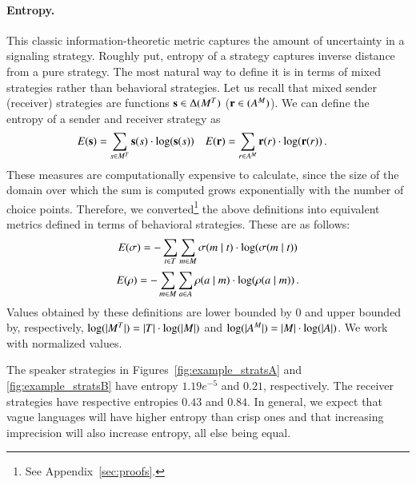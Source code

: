 \paragraph{Entropy.} This classic information-theoretic metric
captures the amount of uncertainty in a signaling strategy. Roughly
put, entropy of a strategy captures inverse distance from a pure
strategy. The most natural way to define it is in terms of mixed
strategies rather than behavioral strategies.  Let us recall that
mixed sender (receiver) strategies are functions $\mathrm{\mathbf{s}} \in
\Delta(M^T)$ ($\mathrm{\mathbf{r}} \in (A^M)$).  We can
define the entropy of a sender and receiver strategy as
\begin{align*}
  E(\mathrm{\mathbf{s}}) & = \sum_{s \in M^T} \mathrm{\mathbf{s}}(s) \cdot
  \log(\mathrm{\mathbf{s}}(s)) & 
  E(\mathrm{\mathbf{r}}) & = \sum_{r \in A^M} \mathrm{\mathbf{r}}(r) \cdot \log(\mathrm{\mathbf{r}}(r)) \,.
\end{align*} 
These measures are computationally expensive to calculate, since the
size of the domain over which the sum is computed grows exponentially
with the number of choice points.  Therefore, we
converted\footnote{See Appendix~\ref{sec:proofs}.} the above definitions into equivalent metrics defined in
terms of behavioral strategies.  These are as follows:
\begin{align*}
  E(\sigma) = -\sum_{t \in T} \sum_{m \in M}
  \sigma(m \mid t) \cdot \log(\sigma(m \mid
  t)) 
\end{align*} 
\begin{align*}
  E(\rho) = -\sum_{m \in M} \sum_{a \in A}
  \rho(a \mid m) \cdot \log(\rho(a \mid
  m)) \,. 
\end{align*}
Values obtained by these definitions are lower bounded by $0$ and
upper bounded by, respectively, $\log(|M^T|) = |T|
\cdot \log(|M|)$ and $\log(|A^M|) = |M| \cdot
\log(|A|)$. We work with normalized values. 

The speaker strategies in Figures~\ref{fig:example_stratsA} and
\ref{fig:example_stratsB} have entropy $1.19e^{-5}$ and $0.21$,
respectively. The receiver strategies have respective entropies $0.43$
and $0.84$. In general, we expect that vague languages will have
higher entropy than crisp ones and that increasing imprecision will
also increase entropy, all else being equal.



